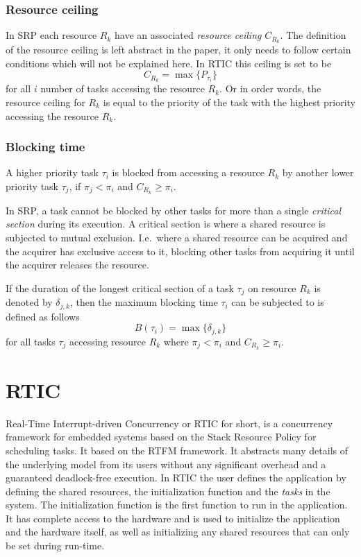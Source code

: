 \subsubsection{Resource ceiling}
\label{theory:srp:definitions:resource}
In SRP each resource $R_k$ have an associated \emph{resource ceiling}
$C_{R_k}$. The definition of the resource ceiling is left abstract in the
paper, it only needs to follow certain conditions which will not be explained
here. In RTIC this ceiling is set to be
\begin{equation}
    C_{R_k} = \max\{P_{\tau_i}\}
\end{equation}
for all $i$ number of tasks accessing the resource $R_k$. Or in order words,
the resource ceiling for $R_k$ is equal to the priority of the task with the
highest priority accessing the resource $R_k$.

\subsubsection{Blocking time}
\label{theory:srp:definitions:blocking}
A higher priority task $\tau_i$ is blocked from accessing a resource $R_k$ by
another lower priority task $\tau_j$, if $\pi_j < \pi_i$ and $C_{R_k} \geq
\pi_i$.

In SRP, a task cannot be blocked by other tasks for more than a single
\emph{critical section} during its execution. A critical section is where a
shared resource is subjected to mutual exclusion. I.e.\ where a shared resource
can be acquired and the acquirer has exclusive access to it, blocking other
tasks from acquiring it until the acquirer releases the resource.

If the duration of the longest critical section of a task $\tau_j$ on resource
$R_k$ is denoted by $\delta_{j,k}$, then the maximum blocking time $\tau_i$ can
be subjected to is defined as follows
\begin{equation}
    B(\tau_i) = \max\{\delta_{j,k}\}
\end{equation}
for all tasks $\tau_j$ accessing resource $R_k$ where $\pi_j < \pi_i$ and
$C_{R_k} \geq \pi_i$.

\section{RTIC}
Real-Time Interrupt-driven Concurrency or RTIC for short, is a concurrency
framework for embedded systems based on the Stack Resource Policy for
scheduling tasks. It based on the RTFM framework\cite{rtfm}. It abstracts many
details of the underlying model from its users without any significant overhead
and a guaranteed deadlock-free execution. In RTIC the user defines the
application by defining the shared resources, the initialization function and
the \emph{tasks} in the system. The initialization function is the first
function to run in the application. It has complete access to the hardware and
is used to initialize the application and the hardware itself, as well as
initializing any shared resources that can only be set during run-time.

